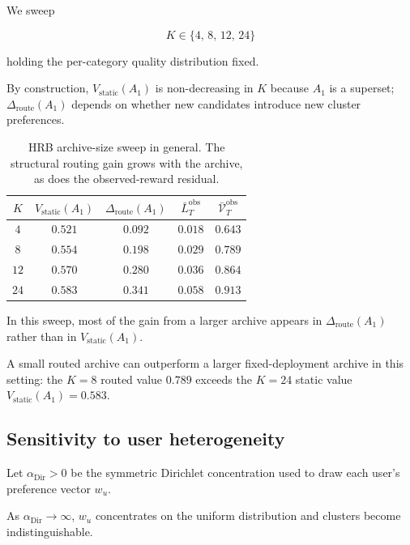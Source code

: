 \documentclass{article} %
\begin{document}
\label{app:K-sweep}

We sweep

\begin{equation}
\label{eq:app-K-grid}
K \in \{4,\, 8,\, 12,\, 24\}
\end{equation}

holding the per-category quality distribution fixed.

By construction, $V_{\mathrm{static}}(A_1)$ is non-decreasing in $K$ because $A_1$ is a superset; $\Delta_{\mathrm{route}}(A_1)$ depends on whether new candidates introduce new cluster preferences.

\begin{table}[h]
\centering
\small
\caption{HRB archive-size sweep in general. The structural routing gain grows with
the archive, as does the observed-reward residual.}
\label{tab:app-K-sweep}
\begin{tabular}{ccccc}
\toprule
$K$ & $V_{\mathrm{static}}(A_1)$ & $\Delta_{\mathrm{route}}(A_1)$ & $\bar L_T^{\mathrm{obs}}$ & $\bar{\mathcal V}_T^{\mathrm{obs}}$ \\
\midrule
$4$  & $0.521$ & $0.092$ & $0.018$ & $0.643$ \\
$8$  & $0.554$ & $0.198$ & $0.029$ & $0.789$ \\
$12$ & $0.570$ & $0.280$ & $0.036$ & $0.864$ \\
$24$ & $0.583$ & $0.341$ & $0.058$ & $0.913$ \\
\bottomrule
\end{tabular}

\end{table}

In this sweep, most of the gain from a larger archive appears in $\Delta_{\mathrm{route}}(A_1)$ rather than in $V_{\mathrm{static}}(A_1)$.

A small routed archive can outperform a larger fixed-deployment archive in this setting: the $K=8$ routed value $0.789$ exceeds the $K=24$ static value $V_{\mathrm{static}}(A_1)=0.583$.

\subsection{Sensitivity to user heterogeneity}

\label{app:dirichlet-sweep}

Let \(\alpha_{\mathrm{Dir}}>0\) be the symmetric Dirichlet concentration used
to draw each user's preference vector \(w_u\).

As \(\alpha_{\mathrm{Dir}}\to\infty\), \(w_u\) concentrates on the uniform
distribution and clusters become indistinguishable.
\end{document}
